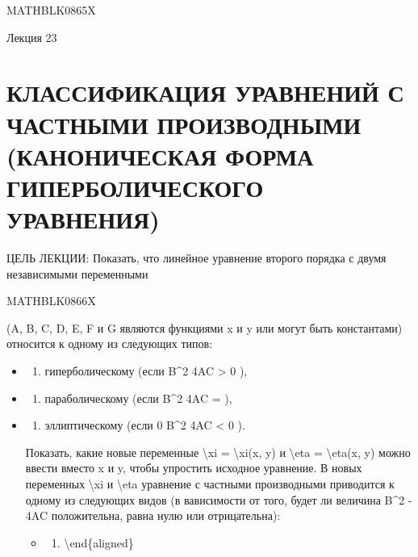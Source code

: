 \documentclass[
]{article}
\providecommand{\tightlist}{%
  \setlength{\itemsep}{0pt}\setlength{\parskip}{0pt}}
\begin{document}
MATHBLK0865X

Лекция 23

\section{КЛАССИФИКАЦИЯ УРАВНЕНИЙ С ЧАСТНЫМИ ПРОИЗВОДНЫМИ (КАНОНИЧЕСКАЯ
ФОРМА ГИПЕРБОЛИЧЕСКОГО
УРАВНЕНИЯ)}\label{ux43aux43bux430ux441ux441ux438ux444ux438ux43aux430ux446ux438ux44f-ux443ux440ux430ux432ux43dux435ux43dux438ux439-ux441-ux447ux430ux441ux442ux43dux44bux43cux438-ux43fux440ux43eux438ux437ux432ux43eux434ux43dux44bux43cux438-ux43aux430ux43dux43eux43dux438ux447ux435ux441ux43aux430ux44f-ux444ux43eux440ux43cux430-ux433ux438ux43fux435ux440ux431ux43eux43bux438ux447ux435ux441ux43aux43eux433ux43e-ux443ux440ux430ux432ux43dux435ux43dux438ux44f}

ЦЕЛЬ ЛЕКЦИИ: Показать, что линейное уравнение второго порядка с двумя
независимыми переменными

MATHBLK0866X

(A, B, C, D, E, F и G являются функциями x и y или могут быть
константами) относится к одному из следующих типов:

\begin{itemize}
\item
  \begin{enumerate}
  \def\labelenumi{\arabic{enumi})}
  \tightlist
  \item
    гиперболическому (если B\^{}2 4AC \textgreater{} 0 ),
  \end{enumerate}
\item
  \begin{enumerate}
  \def\labelenumi{\arabic{enumi})}
  \setcounter{enumi}{1}
  \tightlist
  \item
    параболическому (если B\^{}2 4AC = ),
  \end{enumerate}
\item
  \begin{enumerate}
  \def\labelenumi{\arabic{enumi})}
  \setcounter{enumi}{2}
  \tightlist
  \item
    эллиптическому (если 0 B\^{}2 4AC \textless{} 0 ).
  \end{enumerate}

  Показать, какие новые переменные \textbackslash xi =
  \textbackslash xi(x, y) и \textbackslash eta = \textbackslash eta(x,
  y) можно ввести вместо x и y, чтобы упростить исходное уравнение. В
  новых переменных \textbackslash xi и \textbackslash eta уравнение с
  частными производными приводится к одному из следующих видов (в
  вависимости от того, будет ли величина B\^{}2 - 4AC положительна,
  равна нулю или отрицательна):

  \begin{itemize}
  \tightlist
  \item
    \begin{enumerate}
    \def\labelenumi{\arabic{enumi}.}
    \tightlist
    \item
      \textbackslash end\{aligned\}
    \end{enumerate}
  \end{itemize}
\end{itemize}
\end{document}
